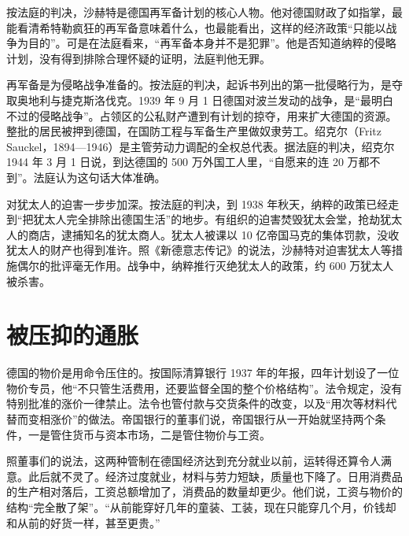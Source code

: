 按法庭的判决，沙赫特是德国再军备计划的核心人物\cite{nca1947}。他对德国财政了如指掌，最能看清希特勒疯狂的再军备意味着什么，也最能看出，这样的经济政策“只能以战争为目的”\cite{nca1947}。可是在法庭看来，“再军备本身并不是犯罪”\cite{nca1947}。他是否知道纳粹的侵略计划，没有得到排除合理怀疑的证明，法庭判他无罪\cite{nca1947}。

再军备是为侵略战争准备的。按法庭的判决，起诉书列出的第一批侵略行为，是夺取奥地利与捷克斯洛伐克\cite{nca1947}。1939 年 9 月 1 日德国对波兰发动的战争，是“最明白不过的侵略战争”\cite{nca1947}。占领区的公私财产遭到有计划的掠夺，用来扩大德国的资源\cite{nca1947}。整批的居民被押到德国，在国防工程与军备生产里做奴隶劳工\cite{nca1947}。绍克尔（Fritz Sauckel，1894—1946）是主管劳动力调配的全权总代表\cite{nca1947,loc30}。据法庭的判决，绍克尔 1944 年 3 月 1 日说，到达德国的 500 万外国工人里，“自愿来的连 20 万都不到”\cite{nca1947}。法庭认为这句话大体准确\cite{nca1947}。

对犹太人的迫害一步步加深。按法庭的判决，到 1938 年秋天，纳粹的政策已经走到“把犹太人完全排除出德国生活”的地步\cite{nca1947}。有组织的迫害焚毁犹太会堂，抢劫犹太人的商店，逮捕知名的犹太商人\cite{nca1947}。犹太人被课以 10 亿帝国马克的集体罚款，没收犹太人的财产也得到准许\cite{nca1947}。照《新德意志传记》的说法，沙赫特对迫害犹太人等措施偶尔的批评毫无作用\cite{schacht2005}。战争中，纳粹推行灭绝犹太人的政策，约 600 万犹太人被杀害\cite{nca1947}。

\section{被压抑的通胀}\label{sec:alternatives-repressed}

德国的物价是用命令压住的。按国际清算银行 1937 年的年报，四年计划设了一位物价专员，他“不只管生活费用，还要监督全国的整个价格结构”\cite{bis1937}。法令规定，没有特别批准的涨价一律禁止\cite{bis1937}。法令也管付款与交货条件的改变，以及“用次等材料代替而变相涨价”的做法\cite{bis1937}。帝国银行的董事们说，帝国银行从一开始就坚持两个条件，一是管住货币与资本市场，二是管住物价与工资\cite{nca1946g}。

照董事们的说法，这两种管制在德国经济达到充分就业以前，运转得还算令人满意\cite{nca1946g}。此后就不灵了。经济过度就业，材料与劳力短缺，质量也下降了\cite{nca1946g}。日用消费品的生产相对落后，工资总额增加了，消费品的数量却更少\cite{nca1946g}。他们说，工资与物价的结构“完全散了架”\cite{nca1946g}。“从前能穿好几年的童装、工装，现在只能穿几个月，价钱却和从前的好货一样，甚至更贵。”\cite{nca1946g}

